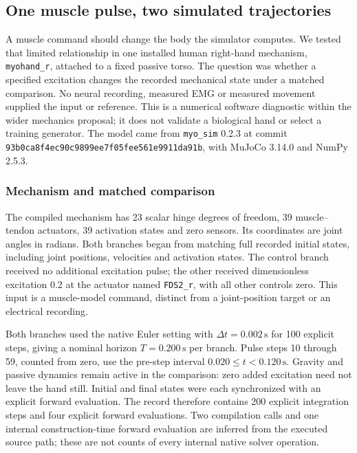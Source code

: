 \subsection{One muscle pulse, two simulated trajectories}

A muscle command should change the body the simulator computes. We tested that limited relationship in one installed human right-hand mechanism, \texttt{myohand\_r}, attached to a fixed passive torso. The question was whether a specified excitation changes the recorded mechanical state under a matched comparison. No neural recording, measured EMG or measured movement supplied the input or reference. This is a numerical software diagnostic within the wider mechanics proposal; it does not validate a biological hand or select a training generator. The model came from \texttt{myo\_sim} 0.2.3 at commit \texttt{93b0ca8f4ec90c9899ee7f05fee561e9911da91b}, with MuJoCo 3.14.0 and NumPy 2.5.3.\cite{myohandMyoSimPinned2026,myohandMuJoCo3140,mujoco2012,myohandNumericalRecord20261105}

\subsubsection{Mechanism and matched comparison}

The compiled mechanism has 23 scalar hinge degrees of freedom, 39 muscle--tendon actuators, 39 activation states and zero sensors. Its coordinates are joint angles in radians. Both branches began from matching full recorded initial states, including joint positions, velocities and activation states. The control branch received no additional excitation pulse; the other received dimensionless excitation 0.2 at the actuator named \texttt{FDS2\_r}, with all other controls zero. This input is a muscle-model command, distinct from a joint-position target or an electrical recording.

Both branches used the native Euler setting with $\Delta t=0.002\,\mathrm{s}$ for 100 explicit steps, giving a nominal horizon $T=0.200\,\mathrm{s}$ per branch. Pulse steps 10 through 59, counted from zero, use the pre-step interval $0.020\leq t<0.120\,\mathrm{s}$. Gravity and passive dynamics remain active in the comparison: zero added excitation need not leave the hand still. Initial and final states were each synchronized with an explicit forward evaluation. The record therefore contains 200 explicit integration steps and four explicit forward evaluations. Two compilation calls and one internal construction-time forward evaluation are inferred from the executed source path; these are not counts of every internal native solver operation.

